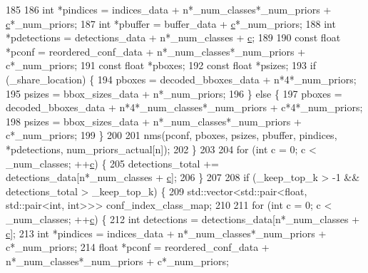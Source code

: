 \begin{DoxyCode}
185 
186                 \textcolor{keywordtype}{int} *pindices    = indices\_data + n*\_num\_classes*\_num\_priors + \hyperlink{CMakeCache_8txt_aac1d6a1710812201527c735f7c6afbaa}{c}*\_num\_priors;
187                 \textcolor{keywordtype}{int} *pbuffer     = buffer\_data + \hyperlink{CMakeCache_8txt_aac1d6a1710812201527c735f7c6afbaa}{c}*\_num\_priors;
188                 \textcolor{keywordtype}{int} *pdetections = detections\_data + n*\_num\_classes + \hyperlink{CMakeCache_8txt_aac1d6a1710812201527c735f7c6afbaa}{c};
189 
190                 \textcolor{keyword}{const} \textcolor{keywordtype}{float} *pconf = reordered\_conf\_data + n*\_num\_classes*\_num\_priors + c*\_num\_priors;
191                 \textcolor{keyword}{const} \textcolor{keywordtype}{float} *pboxes;
192                 \textcolor{keyword}{const} \textcolor{keywordtype}{float} *psizes;
193                 \textcolor{keywordflow}{if} (\_share\_location) \{
194                     pboxes = decoded\_bboxes\_data + n*4*\_num\_priors;
195                     psizes = bbox\_sizes\_data + n*\_num\_priors;
196                 \} \textcolor{keywordflow}{else} \{
197                     pboxes = decoded\_bboxes\_data + n*4*\_num\_classes*\_num\_priors + c*4*\_num\_priors;
198                     psizes = bbox\_sizes\_data + n*\_num\_classes*\_num\_priors + c*\_num\_priors;
199                 \}
200 
201                 nms(pconf, pboxes, psizes, pbuffer, pindices, *pdetections, num\_priors\_actual[n]);
202             \}
203 
204             \textcolor{keywordflow}{for} (\textcolor{keywordtype}{int} c = 0; c < \_num\_classes; ++\hyperlink{CMakeCache_8txt_aac1d6a1710812201527c735f7c6afbaa}{c}) \{
205                 detections\_total += detections\_data[n*\_num\_classes + \hyperlink{CMakeCache_8txt_aac1d6a1710812201527c735f7c6afbaa}{c}];
206             \}
207 
208             \textcolor{keywordflow}{if} (\_keep\_top\_k > -1 && detections\_total > \_keep\_top\_k) \{
209                 std::vector<std::pair<float, std::pair<int, int>>> conf\_index\_class\_map;
210 
211                 \textcolor{keywordflow}{for} (\textcolor{keywordtype}{int} c = 0; c < \_num\_classes; ++\hyperlink{CMakeCache_8txt_aac1d6a1710812201527c735f7c6afbaa}{c}) \{
212                     \textcolor{keywordtype}{int} detections = detections\_data[n*\_num\_classes + \hyperlink{CMakeCache_8txt_aac1d6a1710812201527c735f7c6afbaa}{c}];
213                     \textcolor{keywordtype}{int} *pindices = indices\_data + n*\_num\_classes*\_num\_priors + c*\_num\_priors;
214                     \textcolor{keywordtype}{float} *pconf  = reordered\_conf\_data + n*\_num\_classes*\_num\_priors + c*\_num\_priors;

\end{DoxyCode}
